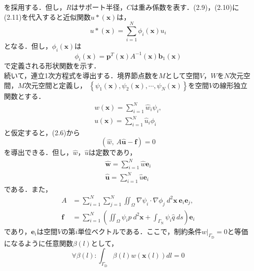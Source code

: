 \documentclass[twocolumn,head_space=15.0mm,foot_space=15.0mm,fleqn]{jlreq}
\numberwithin{equation}{section}
\begin{document}
を採用する．但し，$R$はサポート半径，$C$は重み係数を表す．(2.9)，(2.10)に(2.11)を代入すると近似関数$u* \left( \boldsymbol{x} \right)$は，
\begin{equation*}
	u* \left( \boldsymbol{x} \right) = \sum_{i=1}^N \phi_i \left( \boldsymbol{x} \right) u_i
\end{equation*}
となる．但し，$\phi_i \left( \boldsymbol{x} \right)$は
\begin{equation*}
	\phi_i \left( \boldsymbol{x} \right) = \boldsymbol{p}^T \left( \boldsymbol{x} \right) A^{-1} \left( \boldsymbol{x} \right) \boldsymbol{b}_1 \left( \boldsymbol{x} \right)
\end{equation*}
で定義される形状関数を示す． \\
続いて，連立1次方程式を導出する．境界節点数を$M$として空間$V$，$W$を$N$次元空間，$M$次元空間と定義し，
$\left\{ \psi_1 \left( \boldsymbol{x} \right), \psi_2 \left( \boldsymbol{x} \right), \cdots, \psi_N \left( \boldsymbol{x} \right) \right\}$を空間$V$の線形独立関数とする．
\begin{align}
	w \left( \boldsymbol{x} \right) = \sum_{i=1}^N \hat{w}_i \psi_i , \\
	u \left( \boldsymbol{x} \right) = \sum_{i=1}^N \hat{u}_i \phi_i
\end{align}
と仮定すると，(2.6)から
\begin{equation}
	\left( \hat{w}, \ A \hat{ \boldsymbol{u} } - \boldsymbol{f} \right) = 0
\end{equation}
を導出できる．但し，$\hat{w}$，$\hat{u}$は定数であり，
\begin{align*}
	\hat{ \boldsymbol{w} } = \sum_{i=1}^N \hat{w} \boldsymbol{e}_i \\
	\hat{ \boldsymbol{u} } = \sum_{i=1}^N \hat{u} \boldsymbol{e}_i
\end{align*}
である．また，
\begin{align}
	A &= \sum_{i=1}^N \sum_{j=1}^N \iint_{\Omega} \nabla \psi_i \cdot \nabla \phi_j \ d^2 \boldsymbol{x} \ \boldsymbol{e}_i \boldsymbol{e}_j , \\
	\boldsymbol{f} &= \sum_{i=1}^N \left( \iint_{\Omega} \psi_i p \ d^2 \boldsymbol{x} + \int_{ \Gamma_{ \mathrm{N}} } \psi_i \hat{q} \ ds \right) \boldsymbol{e}_i
\end{align}
であり，$\boldsymbol{e}_i$は空間$V$の第$i$単位ベクトルである．ここで，制約条件$w|_{\Gamma_{\mathrm{D}}} =0$と等価になるように任意関数$\beta \left(l\right)$として，
\begin{equation}
	\forall \beta \left( l \right) : \int_{\Gamma_{\mathrm{D}}} \beta \left( l \right) w \left( \boldsymbol{x} (l) \right) dl = 0
\end{equation}
\end{document}
